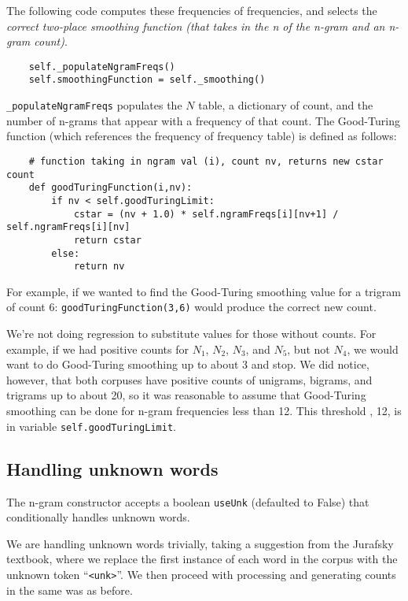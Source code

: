 \documentclass{article}
\begin{document}
The following code computes these frequencies of frequencies, and selects the \emph{correct two-place smoothing function (that takes in the \emph{n} of the n-gram and an n-gram count)}.

{\small\begin{verbatim}
    self._populateNgramFreqs()
    self.smoothingFunction = self._smoothing()
\end{verbatim}}

\texttt{\_populateNgramFreqs} populates the $N$ table, a dictionary of count, and the number of n-grams that appear with a frequency of that count. The Good-Turing function (which references the frequency of frequency table) is defined as follows:

{\small\begin{verbatim}
    # function taking in ngram val (i), count nv, returns new cstar count
    def goodTuringFunction(i,nv):
        if nv < self.goodTuringLimit:
            cstar = (nv + 1.0) * self.ngramFreqs[i][nv+1] / self.ngramFreqs[i][nv]
            return cstar
        else:
            return nv
\end{verbatim}}

For example, if we wanted to find the Good-Turing smoothing value for a trigram of count 6: \texttt{goodTuringFunction(3,6)} would produce the correct new count.

We're not doing regression to substitute values for those without counts. For example, if we had positive counts for $N_1$, $N_2$, $N_3$, and $N_5$, but not $N_4$, we would want to do Good-Turing smoothing up to about 3 and stop. We did notice, however, that both corpuses have positive counts of unigrams, bigrams, and trigrams up to about 20, so it was reasonable to assume that Good-Turing smoothing can be done for n-gram frequencies less than 12. This threshold , 12, is in variable \texttt{self.goodTuringLimit}.

\subsection{Handling unknown words}
The n-gram constructor accepts a boolean \texttt{useUnk} (defaulted to False) that conditionally handles unknown words.\par
We are handling unknown words trivially, taking a suggestion from the Jurafsky textbook, where we replace the first instance of each word in the corpus with the unknown token ``\texttt{<unk>}''. We then proceed with processing and generating counts in the same was as before.
\end{document}
